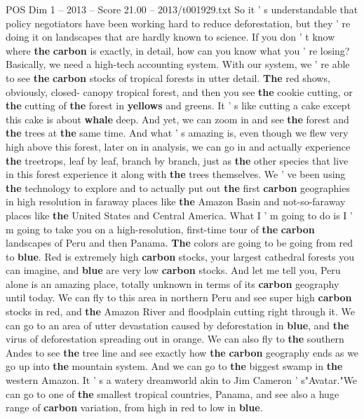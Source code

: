 \begin{textsample}{POS Dim 1 – 2013 – Score 21.00 – 2013/t001929.txt}
So it ' s understandable that policy negotiators have been working hard to reduce deforestation, but they ' re doing it on landscapes that are hardly known to science.
If you don ' t know where \textbf{the} \textbf{carbon} is exactly, in detail, how can you know what you ' re losing?
Basically, we need a high-tech accounting system.
With our system, we ' re able to see \textbf{the} \textbf{carbon} stocks of tropical forests in utter detail. \textbf{The} red shows, obviously, closed- canopy tropical forest, and then you see \textbf{the} cookie cutting, or \textbf{the} cutting of \textbf{the} forest in \textbf{yellows} and greens.
It ' s like cutting a cake except this cake is about \textbf{whale} deep.
And yet, we can zoom in and see \textbf{the} forest and \textbf{the} trees at \textbf{the} same time.
And what ' s amazing is, even though we flew very high above this forest, later on in analysis, we can go in and actually experience \textbf{the} treetrops, leaf by leaf, branch by branch, just as \textbf{the} other species that live in this forest experience it along with \textbf{the} trees themselves.
We ' ve been using \textbf{the} technology to explore and to actually put out \textbf{the} first \textbf{carbon} geographies in high resolution in faraway places like \textbf{the} Amazon Basin and not-so-faraway places like \textbf{the} United States and Central America.
What I ' m going to do is I ' m going to take you on a high-resolution, first-time tour of \textbf{the} \textbf{carbon} landscapes of Peru and then Panama. \textbf{The} colors are going to be going from red to \textbf{blue}.
Red is extremely high \textbf{carbon} stocks, your largest cathedral forests you can imagine, and \textbf{blue} are very low \textbf{carbon} stocks.
And let me tell you, Peru alone is an amazing place, totally unknown in terms of its \textbf{carbon} geography until today.
We can fly to this area in northern Peru and see super high \textbf{carbon} stocks in red, and \textbf{the} Amazon River and floodplain cutting right through it.
We can go to an area of utter devastation caused by deforestation in \textbf{blue}, and \textbf{the} virus of deforestation spreading out in orange.
We can also fly to \textbf{the} southern Andes to see \textbf{the} tree line and see exactly how \textbf{the} \textbf{carbon} geography ends as we go up into \textbf{the} mountain system.
And we can go to \textbf{the} biggest swamp in \textbf{the} western Amazon.
It ' s a watery dreamworld akin to Jim Cameron ' s"Avatar."We can go to one of \textbf{the} smallest tropical countries, Panama, and see also a huge range of \textbf{carbon} variation, from high in red to low in \textbf{blue}.

\end{textsample}
